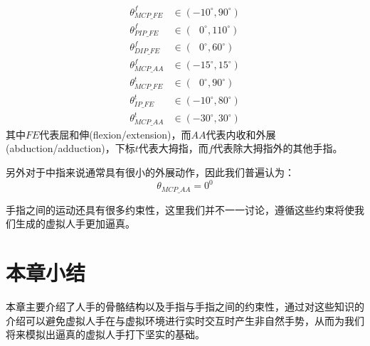 \begin{equation}
 \begin{split}
  \theta^{f}_{MCP\_FE} & \in(-10^\circ, 90^\circ) \\
  \theta^{f}_{PIP\_FE} & \in(~~~0^\circ, 110^\circ) \\
  \theta^{f}_{DIP\_FE} & \in(~~~0^\circ, 60^\circ) \\
  \theta^{f}_{MCP\_AA} & \in(-15^\circ, 15^\circ) \\
  \theta^{t}_{MCP\_FE} & \in(~~~0^\circ, 90^\circ) \\
  \theta^{t}_{IP\_FE}  & \in(-10^\circ, 80^\circ) \\
  \theta^{t}_{MCP\_AA} & \in(-30^\circ, 30^\circ) 
 \end{split}
\end{equation}
其中$FE$代表屈和伸(flexion/extension)，而$AA$代表内收和外展(abduction/adduction)，下标$t$代表大拇指，而$f$代表除大拇指外的其他手指。

另外对于中指来说通常具有很小的外展动作，因此我们普遍认为：
\begin{equation}
  \theta_{MCP\_AA}=0^{0}
\end{equation}

手指之间的运动还具有很多约束性，这里我们并不一一讨论，遵循这些约束将使我们生成的虚拟人手更加逼真。

\section{本章小结}
本章主要介绍了人手的骨骼结构以及手指与手指之间的约束性，通过对这些知识的介绍可以避免虚拟人手在与虚拟环境进行实时交互时产生非自然手势，从而为我们将来模拟出逼真的虚拟人手打下坚实的基础。

